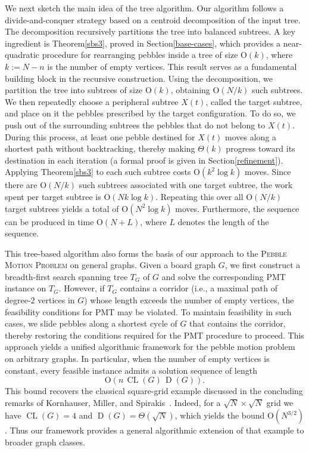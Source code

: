 \documentclass[letter,11pt]{article}
\theoremstyle{definition}
\theoremstyle{definition}
\DeclareMathOperator{\D}{D}
\DeclareMathOperator{\CL}{CL}
\newcommand{\1}{\boldmath$~1~$\unboldmath}
\newcommand{\Ord}{\mathrm{O}}
\newcommand{\tume}{\hspace*{0.2em}}
\begin{document}
We next sketch the main idea of the tree algorithm. 
Our algorithm follows a divide-and-conquer strategy based on a centroid
decomposition of the input tree.
The decomposition recursively partitions the tree into balanced subtrees.
A key ingredient is Theorem\tume\ref{sbs3}, proved in Section\tume\ref{base-cases},
which provides a near-quadratic procedure for rearranging pebbles inside a tree of size 
$\Ord(k)$, where $k:=N-n$ is the number of empty vertices.
This result serves as a fundamental building block
in the recursive construction.
Using the decomposition, we partition the tree into subtrees of size
$\Ord(k)$, obtaining $\Ord(N/k)$ such subtrees.
We then repeatedly choose a peripheral subtree $X(t)$, called the
target subtree, and place on it the pebbles prescribed by the target
configuration.
To do so, we push out of the surrounding subtrees the pebbles that do
not belong to $X(t)$.
During this process, at least one pebble destined for $X(t)$
moves along a shortest path without backtracking,
thereby making $\Theta(k)$ progress toward its destination
in each iteration (a formal proof is given in
Section\tume\ref{refinement}). 
Applying Theorem\tume\ref{sbs3} to each such subtree costs
$\Ord(k^2\log k)$ moves.
Since there are $\Ord(N/k)$ such subtrees associated with one target 
subtree, the work spent per target subtree is $\Ord(Nk\log k)$.
Repeating this over all $\Ord(N/k)$ target subtrees yields a total of
$\Ord(N^2\log k)$ moves.
Furthermore, the sequence can be produced in time $\Ord(N+L)$, where
$L$ denotes the length of the sequence.




This tree-based algorithm also forms the basis of our approach to the
\textsc{Pebble Motion Problem} on general graphs.
Given a board graph $G$, we first construct a breadth-first search
spanning tree $T_G$ of $G$ and solve the corresponding PMT instance
on $T_G$.
However, if $T_G$ contains a corridor (i.e., a maximal path of degree-$2$ 
vertices in $G$) whose length exceeds the number of empty vertices, 
the feasibility conditions for PMT may be violated.
To maintain feasibility in such cases, we slide pebbles along a
shortest cycle of $G$ that contains the corridor, thereby restoring
the conditions required for the PMT procedure to proceed.
This approach yields a unified algorithmic framework for the pebble
motion problem on arbitrary graphs.
In particular, when the number of empty vertices is constant,
every feasible instance admits a solution sequence of length
\[
\Ord(n\,\CL(G)\,\D(G)).
\]
This bound recovers the classical square-grid example discussed in
the concluding remarks of
Kornhauser, Miller, and Spirakis~\cite{715921}.
Indeed, for a $\sqrt N \times \sqrt N$ grid we have
$\CL(G)=4$ and $\D(G)=\Theta(\sqrt N)$, which yields the bound
$\Ord(N^{3/2})$.
Thus our framework provides a general algorithmic extension
of that example to broader graph classes.
\end{document}
